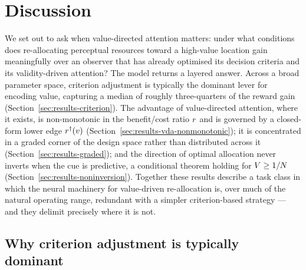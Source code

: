 
\section{Discussion}
\label{sec:discussion}

We set out to ask when value-directed attention matters: under what
conditions does re-allocating perceptual resources toward a high-value
location gain meaningfully over an observer that has already optimised
its decision criteria and its validity-driven attention? The model
returns a layered answer. Across a broad parameter space, criterion
adjustment is typically the dominant lever for encoding value, capturing
a median of roughly three-quarters of the reward gain
(Section~\ref{sec:results-criterion}). The advantage of value-directed
attention, where it exists, is non-monotonic in the benefit/cost ratio
$r$ and is governed by a closed-form lower edge $r^{\dagger}(v)$
(Section~\ref{sec:results-vda-nonmonotonic}); it is concentrated in a
graded corner of the design space rather than distributed across it
(Section~\ref{sec:results-graded}); and the direction of optimal
allocation never inverts when the cue is predictive, a conditional
theorem holding for $V \ge 1/N$
(Section~\ref{sec:results-noninversion}). Together these results
describe a task class in which the neural machinery for value-driven
re-allocation is, over much of the natural operating range, redundant
with a simpler criterion-based strategy --- and they delimit precisely
where it is not.

\subsection*{Why criterion adjustment is typically dominant}

